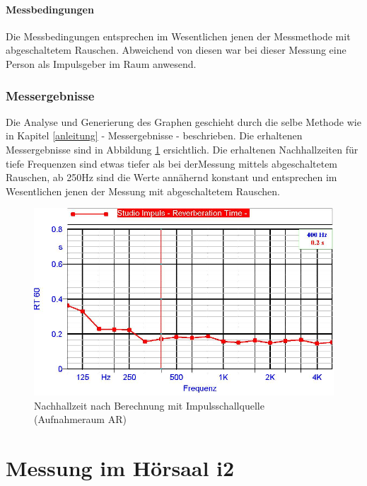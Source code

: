 \documentclass[11pt]{report}
\begin{document}
\paragraph{Messbedingungen}
Die Messbedingungen entsprechen im Wesentlichen jenen der Messmethode mit abgeschaltetem Rauschen. Abweichend von diesen war bei dieser Messung eine Person als Impulsgeber im Raum anwesend.
\subsubsection{Messergebnisse}
Die Analyse und Generierung des Graphen geschieht durch die selbe Methode wie in Kapitel \ref{anleitung} - Messergebnisse - beschrieben. Die erhaltenen Messergebnisse sind in Abbildung \ref{fig:impulsmp1} ersichtlich. Die erhaltenen Nachhallzeiten f\"ur tiefe Frequenzen sind etwas tiefer als bei derMessung mittels abgeschaltetem Rauschen, ab 250Hz sind die Werte ann\"ahernd konstant und entsprechen im Wesentlichen jenen der Messung mit abgeschaltetem Rauschen.
\begin{figure}[htbp]
\begin{center}
\includegraphics[width=14cm,keepaspectratio=true]{ImpulsMP1}
\caption{Nachhallzeit nach Berechnung mit Impulsschallquelle (Aufnahmeraum AR)}
\label{fig:impulsmp1}
\end{center}
\end{figure}
\section{Messung im H\"orsaal i2}
\end{document}

